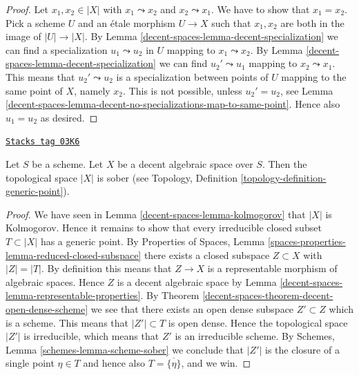 \begin{proof}
Let $x_1, x_2 \in |X|$ with $x_1 \leadsto x_2$ and $x_2 \leadsto x_1$.
We have to show that $x_1 = x_2$. Pick a scheme $U$ and an \'etale morphism
$U \to X$ such that $x_1, x_2$ are both in the image of $|U| \to |X|$.
By Lemma \ref{decent-spaces-lemma-decent-specialization} we can find a specialization
$u_1 \leadsto u_2$ in $U$ mapping to $x_1 \leadsto x_2$.
By Lemma \ref{decent-spaces-lemma-decent-specialization} we can find
$u_2' \leadsto u_1$ mapping to $x_2 \leadsto x_1$. This means that
$u_2' \leadsto u_2$ is a specialization between points of $U$ mapping to
the same point of $X$, namely $x_2$. This is not possible, unless
$u_2' = u_2$, see
Lemma \ref{decent-spaces-lemma-decent-no-specializations-map-to-same-point}. Hence
also $u_1 = u_2$ as desired.
\end{proof}

\begin{proposition}
\label{decent-spaces-proposition-reasonable-sober}
\href{https://stacks.math.columbia.edu/tag/03K6}{\texttt{Stacks tag 03K6}}

Let $S$ be a scheme. Let $X$ be a decent algebraic space over $S$.
Then the topological space $|X|$ is sober (see
Topology, Definition \ref{topology-definition-generic-point}).
\end{proposition}

\begin{proof}
We have seen in Lemma \ref{decent-spaces-lemma-kolmogorov} that $|X|$ is Kolmogorov.
Hence it remains to show that every irreducible closed subset
$T \subset |X|$ has a generic point. By
Properties of Spaces,
Lemma \ref{spaces-properties-lemma-reduced-closed-subspace}
there exists a closed subspace $Z \subset X$ with $|Z| = |T|$.
By definition this means that $Z \to X$ is a representable morphism
of algebraic spaces. Hence $Z$ is a decent algebraic space
by Lemma \ref{decent-spaces-lemma-representable-properties}. By
Theorem \ref{decent-spaces-theorem-decent-open-dense-scheme}
we see that there exists an open dense subspace $Z' \subset Z$
which is a scheme. This means that $|Z'| \subset T$ is open dense.
Hence the topological space $|Z'|$ is irreducible, which means that
$Z'$ is an irreducible scheme. By
Schemes, Lemma \ref{schemes-lemma-scheme-sober}
we conclude that $|Z'|$ is the closure of a single point $\eta \in T$
and hence also $T = \overline{\{\eta\}}$, and we win.
\end{proof}

